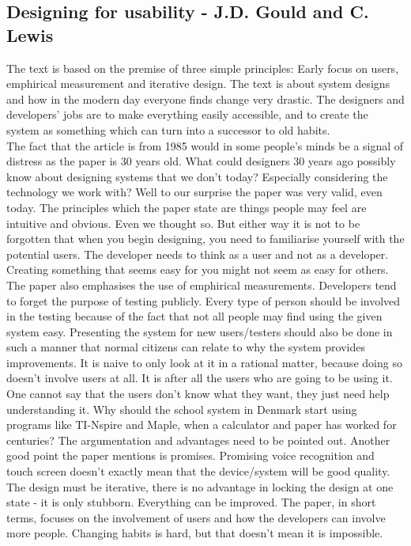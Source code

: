 \documentclass[12pt,a4paper]{article}
\begin{document}
\subsection{Designing for usability - J.D. Gould and C. Lewis}
The text is based on the premise of three simple principles: Early focus on users, emphirical measurement and iterative design. The text is about system designs and how in the modern day everyone finds change very drastic. The designers and developers' jobs are to make everything easily accessible, and to create the system as something which can turn into a successor to old habits. \\
The fact that the article is from 1985 would in some people's minds be a signal of distress as the paper is 30 years old. What could designers 30 years ago possibly know about designing systems that we don't today? Especially considering the technology we work with? Well to our surprise the paper was very valid, even today. The principles which the paper state are things people may feel are intuitive and obvious. Even we thought so. But either way it is not to be forgotten that when you begin designing, you need to familiarise yourself with the potential users. The developer needs to think as a user and not as a developer. Creating something that seems easy for you might not seem as easy for others. The paper also emphasises the use of emphirical measurements. Developers tend to forget the purpose of testing publicly. Every type of person should be involved in the testing because of the fact that not all people may find using the given system easy. Presenting the system for new users/testers should also be done in such a manner that normal citizens can relate to why the system provides improvements. It is naive to only look at it in a rational matter, because doing so doesn't involve users at all. It is after all the users who are going to be using it. One cannot say that the users don't know what they want, they just need help understanding it. Why should the school system in Denmark start using programs like TI-Nspire and Maple, when a calculator and paper has worked for centuries? The argumentation and advantages need to be pointed out. Another good point the paper mentions is promises. Promising voice recognition and touch screen doesn't exactly mean that the device/system will be good quality. The design must be iterative, there is no advantage in locking the design at one state - it is only stubborn. Everything can be improved.
The paper, in short terms, focuses on the involvement of users and how the developers can involve more people. Changing habits is hard, but that doesn't mean it is impossible. 
\end{document}
